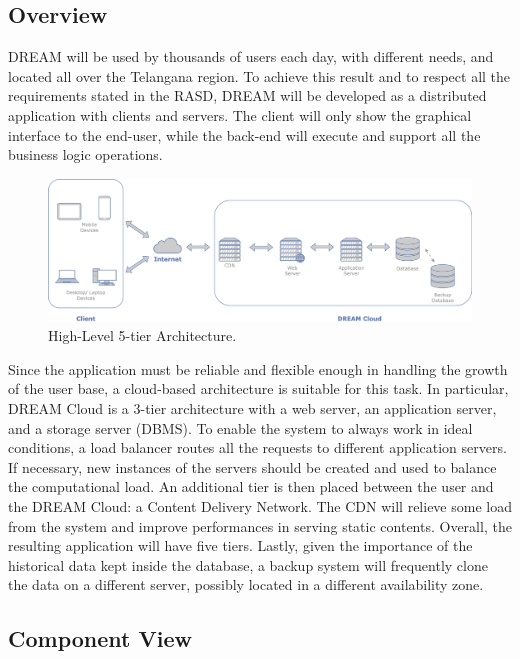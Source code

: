\subsection{Overview}
DREAM will be used by thousands of users each day, with different needs, and located all over the Telangana region. To achieve this result and to respect all the requirements stated in the RASD, DREAM will be developed as a distributed application with clients and servers. The client will only show the graphical interface to the end-user, while the back-end will execute and support all the business logic operations. 
\begin{figure}[hbt!]
\centering
\includegraphics[width=\textwidth]{../images_diagrams/dd/highlevel_arch.png}
\caption{High-Level 5-tier Architecture.}
\label{fig:highLevelArch}
\end{figure}

\noindent
Since the application must be reliable and flexible enough in handling the growth of the user base, a cloud-based architecture is suitable for this task. In particular, DREAM Cloud is a 3-tier architecture with a web server, an application server, and a storage server (DBMS). To enable the system to always work in ideal conditions, a load balancer routes all the requests to different application servers. If necessary, new instances of the servers should be created and used to balance the computational load. An additional tier is then placed between the user and the DREAM Cloud: a Content Delivery Network. The CDN will relieve some load from the system and improve performances in serving static contents. Overall, the resulting application will have five tiers. Lastly, given the importance of the historical data kept inside the database, a backup system will frequently clone the data on a different server, possibly located in a different availability zone.

\subsection{Component View}

